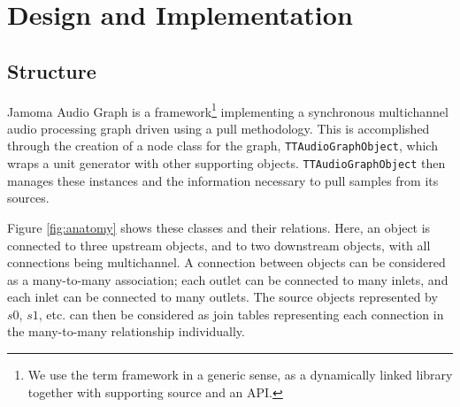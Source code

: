 \documentclass[twoside,a4paper]{article}
\begin{document}



%
\section{Design and Implementation} %
%

\subsection{Structure} %

Jamoma Audio Graph is a framework\footnote{We use the term framework in a generic sense, as a dynamically linked library together with supporting source and an API.} implementing a synchronous multichannel audio processing graph driven using a pull methodology.
This is accomplished through the creation of a node class for the graph, \texttt{TTAudioGraphObject}, which wraps a unit generator with other supporting objects.  
\texttt{TTAudioGraphObject} then manages these instances and the information necessary to pull samples from its sources. 

Figure \ref{fig:anatomy} shows these classes and their relations. Here, an object is connected to three upstream objects, and to two downstream objects, with all connections being multichannel. 
A connection between objects can be considered as a many-to-many association; each outlet can be connected to many inlets, and each inlet can be connected to many outlets. 
The source objects represented by $s0$, $s1$, etc. can then be considered as join tables representing each connection in the many-to-many relationship individually.
\end{document}
